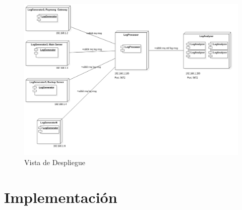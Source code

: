 \documentclass[11pt]{article}
\begin{document}
\begin{landscape}
\begin{center}
 \begin{figure}[H]
 \begin{center}
   \includegraphics[width=20.5cm]{img/physical_view00.png}
   \caption{Vista de Despliegue}
   \label{fig:4plus1views}
 \end{center}
 \end{figure}
\end{center}
\end{landscape}
\restoregeometry

\pagebreak

\section{Implementación}
\end{document}
